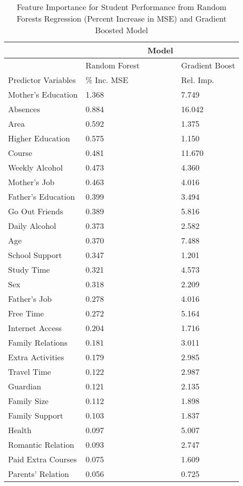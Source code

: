 \documentclass[sigconf]{acmart}
\begin{document}
\begin{table}
  \caption{Feature Importance for Student Performance from Random Forests 
  Regression (Percent Increase in MSE) and Gradient Boosted Model}
  \label{tab:freq}
  \begin{tabular}{llll}
    \toprule
            &           & Model &  \\ 
    \midrule  
            & Random Forest & & Gradient Boost \\    
    \midrule   
    Predictor Variables & \% Inc. MSE & & Rel. Imp. \\    
    \midrule
    Mother's Education  &  1.368 &   &  7.749 \\
    Absences            &  0.884 &   & 16.042 \\
    Area                &  0.592 &   &  1.375 \\
    Higher Education    &  0.575 &   &  1.150 \\   
    Course              &  0.481 &   & 11.670 \\ 
    Weekly Alcohol      &  0.473 &   &  4.360 \\
    Mother's Job        &  0.463 &   &  4.016 \\  
    Father's Education  &  0.399 &   &  3.494 \\      
    Go Out Friends      &  0.389 &   &  5.816 \\
    Daily Alcohol       &  0.373 &   &  2.582 \\
    Age                 &  0.370 &   &  7.488 \\
    School Support      &  0.347 &   &  1.201 \\  
    Study Time          &  0.321 &   &  4.573 \\
    Sex                 &  0.318 &   &  2.209 \\
    Father's Job        &  0.278 &   &  4.016 \\     
    Free Time           &  0.272 &   &  5.164 \\
    Internet Access     &  0.204 &   &  1.716 \\   
    Family Relations    &  0.181 &   &  3.011 \\
    Extra Activities    &  0.179 &   &  2.985 \\
    Travel Time         &  0.122 &   &  2.987 \\ 
    Guardian            &  0.121 &   &  2.135 \\
    Family Size         &  0.112 &   &  1.898 \\
    Family Support      &  0.103 &   &  1.837 \\
    Health              &  0.097 &   &  5.007 \\ 
    Romantic Relation   &  0.093 &   &  2.747 \\
    Paid Extra Courses  &  0.075 &   &  1.609 \\
    Parents' Relation   &  0.056 &   &  0.725 \\
    \bottomrule
  \end{tabular}
\end{table}
\end{document}
